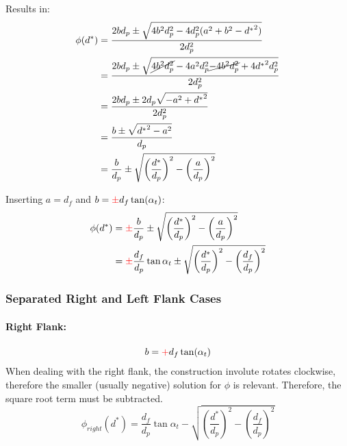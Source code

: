 Results in:
\begin{subequations}
\begin{align}
    \phi(d^*)   &= \frac{2bd_p \pm \sqrt{4b^2d_p^2 - 4d_p^2(a^2 + b^2 - {d^*}^2)}}{2d_p^2} \\
                &= \frac{2bd_p \pm \sqrt{\cancel{ 4b^2d_p^2} - 4a^2d_p^2
                                         \cancel{-4b^2d_p^2} + 4{d^*}^2d_p^2}}{2d_p^2} \\
                &= \frac{2bd_p \pm 2d_p\sqrt{-a^2 + {d^*}^2}}{2d_p^2}\\
                &= \frac{b \pm \sqrt{{d^*}^2- a^2}}{d_p} \\
                &= \frac{b}{d_p} \pm \sqrt{\left(\frac{d^*}{d_p}\right)^2- \left(\frac{a}{d_p}\right)^2}
\end{align}
\end{subequations}

Inserting $a=d_f$ and $b=\textcolor{red}{\pm} d_f \tan(\alpha_t)$:
\begin{subequations}
\begin{align}
    \phi(d^*)   &= \textcolor{red}{\pm}\frac{b}{d_p} \pm \sqrt{\left(\frac{d^*}{d_p}\right)^2- \left(\frac{a}{d_p}\right)^2} \\
                &= \textcolor{red}{\pm}\frac{d_f}{d_p}\tan{\alpha_t} \pm \sqrt{\left(\frac{d^*}{d_p}\right)^2- \left(\frac{d_f}{d_p}\right)^2} \\
\end{align}
\end{subequations}

\subsubsection{Separated Right and Left Flank Cases}

\paragraph{Right Flank:}
\begin{equation*}
    b = \textcolor{red}{+}d_f\tan(\alpha_t)
\end{equation*}
When dealing with the right flank, the construction involute rotates clockwise, therefore the smaller (usually negative) solution for $\phi$ is relevant. Therefore, the square root term must be subtracted.
\begin{equation}
    \phi_{right}(d^*) = \frac{d_f}{d_p}\tan{\alpha_t} - \sqrt{\left(\frac{d^*}{d_p}\right)^2 - \left(\frac{d_f}{d_p}\right)^2}
\end{equation}

